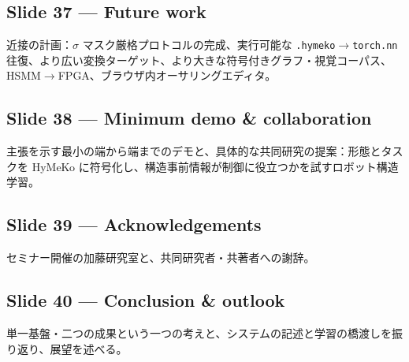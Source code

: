 \documentclass[10pt]{article}
\begin{document}
\subsection*{Slide 37 --- Future work}
近接の計画：$\sigma$ マスク厳格プロトコルの完成、実行可能な \texttt{.hymeko}$\to$\texttt{torch.nn} 往復、より広い変換ターゲット、より大きな符号付きグラフ・視覚コーパス、HSMM$\to$FPGA、ブラウザ内オーサリングエディタ。

\subsection*{Slide 38 --- Minimum demo \& collaboration}
主張を示す最小の端から端までのデモと、具体的な共同研究の提案：形態とタスクを HyMeKo に符号化し、構造事前情報が制御に役立つかを試すロボット構造学習。

\subsection*{Slide 39 --- Acknowledgements}
セミナー開催の加藤研究室と、共同研究者・共著者への謝辞。

\subsection*{Slide 40 --- Conclusion \& outlook}
単一基盤・二つの成果という一つの考えと、システムの記述と学習の橋渡しを振り返り、展望を述べる。
\end{document}
